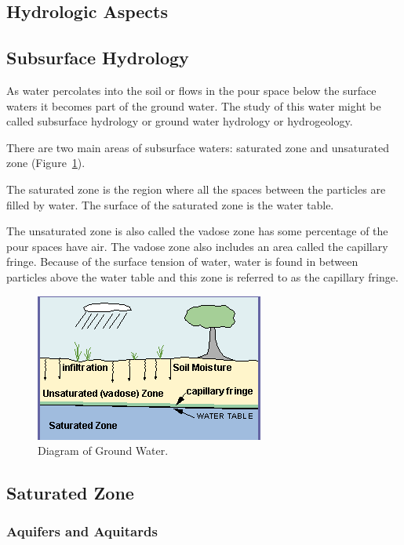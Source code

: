 \documentclass{book}\usepackage{knitr}
\begin{document}
\begin{knitrout}
\begin{kframe}
\section{Hydrologic Aspects}

\subsection{Subsurface Hydrology}

As water percolates into the soil or flows in the pour space below the surface waters it becomes part of the ground water. The study of this water might be called subsurface hydrology or ground water hydrology or hydrogeology. 

There are two main areas of subsurface waters: saturated zone and unsaturated zone (Figure~\ref{fig:groundwater}).

The saturated zone is the region where all the spaces between the particles are filled by water. The surface of the saturated zone is the water table. 

The unsaturated zone is also called the vadose zone has some percentage of the pour spaces have air. The vadose zone also includes an area called the capillary fringe. Because of the surface tension of water, water is found in between particles above the water table and this zone is referred to as the capillary fringe. 

\begin{figure}
\includegraphics{images/critical-zone/groundwater}
\caption{Diagram of Ground Water. }
\label{fig:groundwater}
\end{figure}

\subsection{Saturated Zone}

\subsubsection{Aquifers and Aquitards}


\end{kframe}
\end{knitrout}
\end{document}
